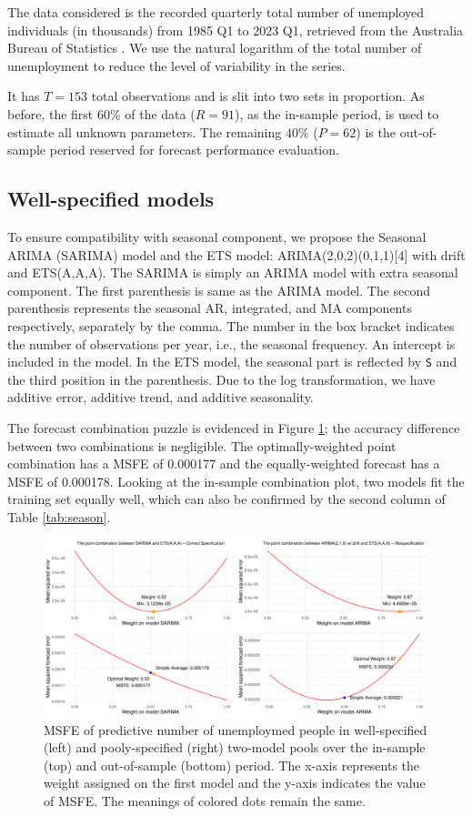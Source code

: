\documentclass{monashthesis}
\begin{document}
The data considered is the recorded quarterly total number of unemployed individuals (in thousands) from 1985 Q1 to 2023 Q1, retrieved from the Australia Bureau of Statistics \autocite{ABS}. We use the natural logarithm of the total number of unemployment to reduce the level of variability in the series.

It has \(T = 153\) total observations and is slit into two sets in proportion. As before, the first 60\% of the data (\(R = 91\)), as the in-sample period, is used to estimate all unknown parameters. The remaining 40\% (\(P = 62\)) is the out-of-sample period reserved for forecast performance evaluation.

\subsection*{Well-specified models}

To ensure compatibility with seasonal component, we propose the Seasonal ARIMA (SARIMA) model and the ETS model: ARIMA(2,0,2)(0,1,1){[}4{]} with drift and ETS(A,A,A). The SARIMA is simply an ARIMA model with extra seasonal component. The first parenthesis is same as the ARIMA model. The second parenthesis represents the seasonal AR, integrated, and MA components respectively, separately by the comma. The number in the box bracket indicates the number of observations per year, i.e., the seasonal frequency. An intercept is included in the model. In the ETS model, the seasonal part is reflected by \texttt{S} and the third position in the parenthesis. Due to the log transformation, we have additive error, additive trend, and additive seasonality.

The forecast combination puzzle is evidenced in Figure \ref{fig:sd}; the accuracy difference between two combinations is negligible. The optimally-weighted point combination has a MSFE of 0.000177 and the equally-weighted forecast has a MSFE of 0.000178. Looking at the in-sample combination plot, two models fit the training set equally well, which can also be confirmed by the second column of Table \ref{tab:season}.

\begin{figure}[ht]
\centering
\includegraphics[scale=0.5]{figures/EMPL.pdf}
\caption{MSFE of predictive number of unemploymed people in well-specified (left) and pooly-specified (right) two-model pools over the in-sample (top) and out-of-sample (bottom) period. The x-axis represents the weight assigned on the first model and the y-axis indicates the value of MSFE. The meanings of colored dots remain the same.}
\label{fig:sd}
\end{figure}
\end{document}
